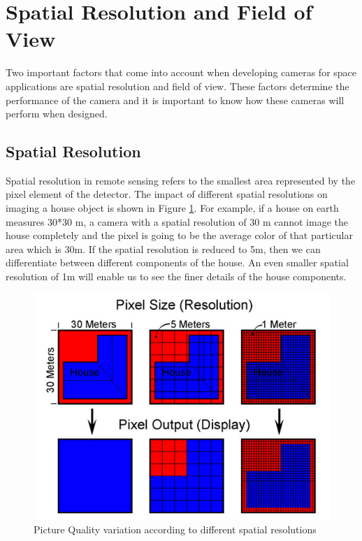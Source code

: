 \section{Spatial Resolution and Field of View}
Two important factors that come into account when developing cameras for space applications are spatial resolution and field of view. These factors determine the performance of the camera and it is important to know how these cameras will perform when designed.


\subsection{Spatial Resolution}
Spatial resolution in remote sensing refers to the smallest area represented by the pixel element of the detector. The impact of different spatial resolutions on imaging a house object is shown in Figure \ref{fig:spatial_resolution}. For example, if a house on earth measures 30*30 m, a camera with a spatial resolution of 30 m cannot image the house completely and the pixel is going to be the average color of that particular area which is 30m. If the spatial resolution is reduced to 5m, then we can differentiate between different components of the house. An even smaller spatial resolution of 1m will enable us to see the finer details of the house components. 

\begin{figure}[htb]
\includegraphics[width=\textwidth]{pics/spatial-resolution}
\caption{Picture Quality variation according to different spatial resolutions\cite{SpatialResol}}
\label{fig:spatial_resolution}
\end{figure}

